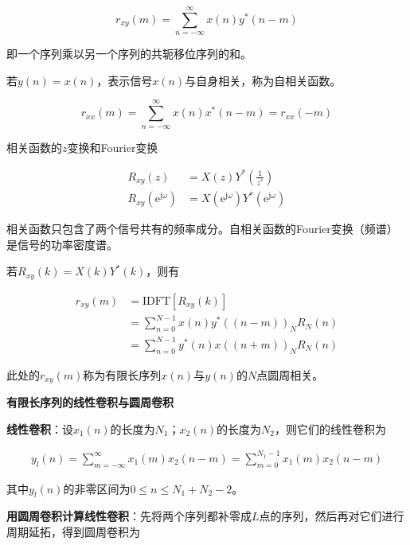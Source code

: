 \documentclass[cn, hazy, blue, normal, 14pt]{elegantnote}
\begin{document}
\begin{equation}
    r_{xy}(m)=\sum_{n=-\infty}^{\infty}{x(n)y^*(n-m)}
\end{equation}

即一个序列乘以另一个序列的共轭移位序列的和。

若$y(n)=x(n)$，表示信号$x(n)$与自身相关，称为自相关函数。

\begin{equation}
    r_{xx}(m)=\sum_{n=-\infty}^{\infty}{x(n)x^*(n-m)}=r_{xx}(-m)
\end{equation}

相关函数的$z$变换和Fourier变换

\begin{equation}
\begin{aligned}
    R_{xy}(z)&=X(z)Y^*\left(\frac{1}{z^*}\right) \\
    R_{xy}(\text{e}^{\text{j}\omega})&=X(\text{e}^{\text{j}\omega})Y^*(\text{e}^{\text{j}\omega})
\end{aligned}
\end{equation}

相关函数只包含了两个信号共有的频率成分。自相关函数的Fourier变换（频谱）是信号的功率密度谱。

若$R_{xy}(k)=X(k)Y^*(k)$，则有

\begin{equation}
\begin{aligned}
    r_{xy}(m)&=\text{IDFT}[R_{xy}(k)] \\
    &=\sum_{n=0}^{N-1}{x(n)y^*((n-m))_N R_N(n)} \\
    &=\sum_{n=0}^{N-1}{y^*(n)x((n+m))_N R_N(n)} 
\end{aligned}
\end{equation}

此处的$r_{xy}(m)$称为有限长序列$x(n)$与$y(n)$的$N$点圆周相关。

\textbf{有限长序列的线性卷积与圆周卷积}

\textbf{线性卷积}：设$x_1(n)$的长度为$N_1$；$x_2(n)$的长度为$N_2$，则它们的线性卷积为

\begin{equation}
\begin{aligned}
    y_l(n)=\sum_{m=-\infty}^{\infty}{x_1(m)x_2(n-m)}=\sum_{m=0}^{N_1-1}{x_1(m)x_2(n-m)}
\end{aligned}
\end{equation}

其中$y_l(n)$的非零区间为$0\leq n\leq N_1+N_2-2$。

\textbf{用圆周卷积计算线性卷积}：先将两个序列都补零成$L$点的序列，然后再对它们进行周期延拓，得到圆周卷积为
\end{document}

